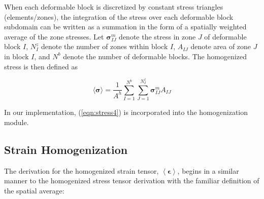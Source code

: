 



When each deformable block is discretized by constant stress triangles (elements/zones), the integration of the stress over each deformable block subdomain can be written as a summation in the form of a spatially weighted average of the zone stresses. Let $\boldsymbol{\sigma}_{IJ}^{m}$ denote the stress in zone $J$ of deformable block $I$, $N_{I}^{z}$ denote the number of zones within block $I$, $A_{IJ}$ denote area of zone $J$ in block $I$, and $N^{b}$ denote the number of deformable blocks. The homogenized stress is then defined as 

\begin{equation}
\langle\boldsymbol{\sigma}\rangle=\frac{1}{A^{h}}\sum_{I=1}^{N^{b}}\sum_{J=1}^{N_{I}^{z}}\boldsymbol{\sigma}_{IJ}^{m}A_{IJ}\label{eqn:stress4}
\end{equation}

In our implementation, (\ref{eqn:stress4}) is incorporated into the homogenization module.

\subsection{Strain Homogenization}

The derivation for the homogenized strain tensor, $\left< \boldsymbol{\epsilon}\right>$, begins in a similar manner to the homogenized stress tensor derivation with the familiar definition of the spatial average:

